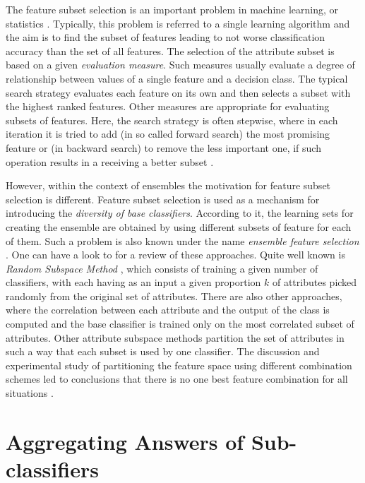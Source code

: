 \documentclass[runningheads]{llncs}
\begin{document}
The feature subset selection is an important problem in machine learning, or
statistics \cite{Dash,Kohavi95,MBK98}. Typically, this problem is referred
to a single learning algorithm and the aim is to find the subset of features
leading to not worse classification accuracy than the set of all features.
 The selection of the attribute subset is based on a given {\em
evaluation measure}. Such measures usually evaluate a degree of relationship
between values of a single feature and a decision class. The typical search
strategy evaluates each feature on its own and then selects a subset with
the highest ranked features. Other measures are appropriate for evaluating
subsets of features. Here, the search strategy is often stepwise, where in
each iteration it is tried to add (in so called forward search) the most
promising  feature or (in backward search) to remove the less important one,
if such operation results in a receiving a better subset \cite{Kohavi95}.

 However, within the context of ensembles  the motivation for feature
 subset selection is different. Feature subset
 selection is used as a mechanism for introducing  the {\em diversity of base classifiers}.
 According to it, the learning sets for creating the ensemble are obtained
 by using different subsets of
feature for each of them. Such a problem is also known under the name {\em
ensemble feature selection} \cite{Optiz99}.
 One can have a look to \cite{Valenti,Kunchevabook} for a review of these approaches.
 Quite well known is {\em Random Subspace
Method} \cite{Ho}, which consists of training a given number of classifiers,
with each having as an input a given proportion $k$ of attributes picked
randomly from the original set of attributes. There are also other
approaches, where the correlation between each attribute and the output of
the class is computed and the base classifier is trained only on the most
correlated subset of attributes. Other attribute subspace methods partition
the set of attributes in such a way that each subset is used by one
classifier.  The discussion and experimental study of partitioning the
feature space using different combination schemes
 led to conclusions that there is no one best feature combination
 for  all situations \cite{Kunchevabook}.

\section{Aggregating Answers of Sub-classifiers}
\end{document}
